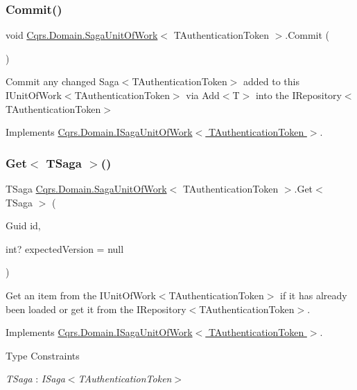 \subsubsection{\texorpdfstring{Commit()}{Commit()}}
{\footnotesize\ttfamily void \hyperlink{classCqrs_1_1Domain_1_1SagaUnitOfWork}{Cqrs.\+Domain.\+Saga\+Unit\+Of\+Work}$<$ T\+Authentication\+Token $>$.Commit (\begin{DoxyParamCaption}{ }\end{DoxyParamCaption})}



Commit any changed Saga$<$\+T\+Authentication\+Token$>$ added to this I\+Unit\+Of\+Work$<$\+T\+Authentication\+Token$>$ via Add$<$\+T$>$ into the I\+Repository$<$\+T\+Authentication\+Token$>$ 



Implements \hyperlink{interfaceCqrs_1_1Domain_1_1ISagaUnitOfWork_aaa8a63b5304c837deec8a0103eb702f7}{Cqrs.\+Domain.\+I\+Saga\+Unit\+Of\+Work$<$ T\+Authentication\+Token $>$}.

\mbox{\label{classCqrs_1_1Domain_1_1SagaUnitOfWork_acebe159e3b27e36a91909e97cf37d28d}} 
\subsubsection{\texorpdfstring{Get$<$ T\+Saga $>$()}{Get< TSaga >()}}
{\footnotesize\ttfamily T\+Saga \hyperlink{classCqrs_1_1Domain_1_1SagaUnitOfWork}{Cqrs.\+Domain.\+Saga\+Unit\+Of\+Work}$<$ T\+Authentication\+Token $>$.Get$<$ T\+Saga $>$ (\begin{DoxyParamCaption}\item[{Guid}]{id,  }\item[{int?}]{expected\+Version = {\ttfamily null} }\end{DoxyParamCaption})}



Get an item from the I\+Unit\+Of\+Work$<$\+T\+Authentication\+Token$>$ if it has already been loaded or get it from the I\+Repository$<$\+T\+Authentication\+Token$>$. 



Implements \hyperlink{interfaceCqrs_1_1Domain_1_1ISagaUnitOfWork_a4c4745fcebc42ba5c94647b22939809b}{Cqrs.\+Domain.\+I\+Saga\+Unit\+Of\+Work$<$ T\+Authentication\+Token $>$}.

\begin{Desc}
\item[Type Constraints]\begin{description}
\item[{\em T\+Saga} : {\em I\+Saga$<$T\+Authentication\+Token$>$}]\end{description}
\end{Desc}
